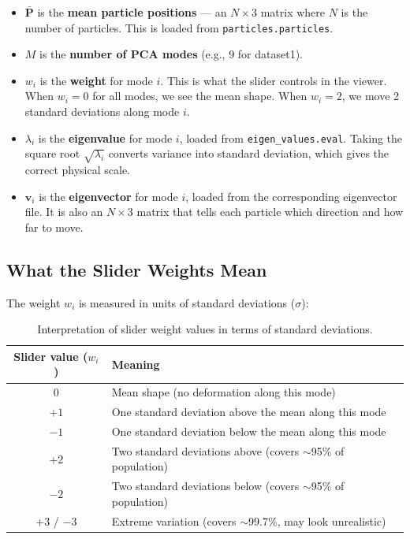 \documentclass[12pt,a4paper]{article}
\begin{document}
\begin{itemize}[itemsep=0.5em]
    \item $\bar{\mathbf{P}}$ is the \textbf{mean particle positions} --- an $N \times 3$ matrix where $N$ is the number of particles. This is loaded from \texttt{particles.particles}.

    \item $M$ is the \textbf{number of PCA modes} (e.g., 9 for dataset1).

    \item $w_i$ is the \textbf{weight} for mode $i$. This is what the slider controls in the viewer. When $w_i = 0$ for all modes, we see the mean shape. When $w_i = 2$, we move 2 standard deviations along mode $i$.

    \item $\lambda_i$ is the \textbf{eigenvalue} for mode $i$, loaded from \texttt{eigen\_values.eval}. Taking the square root $\sqrt{\lambda_i}$ converts variance into standard deviation, which gives the correct physical scale.

    \item $\mathbf{v}_i$ is the \textbf{eigenvector} for mode $i$, loaded from the corresponding eigenvector file. It is also an $N \times 3$ matrix that tells each particle which direction and how far to move.
\end{itemize}

\subsection{What the Slider Weights Mean}

The weight $w_i$ is measured in units of standard deviations ($\sigma$):

\begin{table}[H]
\centering
\renewcommand{\arraystretch}{1.3}
\begin{tabular}{@{}cl@{}}
\toprule
\textbf{Slider value ($w_i$)} & \textbf{Meaning} \\
\midrule
$0$ & Mean shape (no deformation along this mode) \\
$+1$ & One standard deviation above the mean along this mode \\
$-1$ & One standard deviation below the mean along this mode \\
$+2$ & Two standard deviations above (covers $\sim$95\% of population) \\
$-2$ & Two standard deviations below (covers $\sim$95\% of population) \\
$+3$ / $-3$ & Extreme variation (covers $\sim$99.7\%, may look unrealistic) \\
\bottomrule
\end{tabular}
\caption{Interpretation of slider weight values in terms of standard deviations.}
\label{tab:weights}
\end{table}
\end{document}
